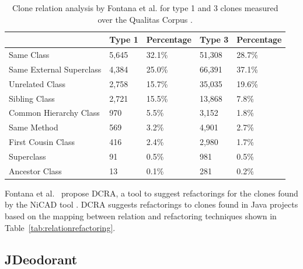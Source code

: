 \begin{table}[H]
\centering
\begin{tabular}{@{}lllll@{}}
\toprule
                         & Type 1 & Percentage & Type 3 & Percentage \\ \midrule
Same Class               & 5,645  & 32.1\%     & 51,308 & 28.7\%     \\
Same External Superclass & 4,384  & 25.0\%     & 66,391 & 37.1\%     \\
Unrelated Class          & 2,758  & 15.7\%     & 35,035 & 19.6\%     \\
Sibling Class            & 2,721  & 15.5\%     & 13,868 & 7.8\%      \\
Common Hierarchy Class   & 970    & 5.5\%      & 3,152  & 1.8\%      \\
Same Method              & 569    & 3.2\%      & 4,901  & 2.7\%      \\
First Cousin Class       & 416    & 2.4\%      & 2,980  & 1.7\%      \\
Superclass               & 91     & 0.5\%      & 981    & 0.5\%      \\
Ancestor Class           & 13     & 0.1\%      & 281    & 0.2\%      \\ \bottomrule
\end{tabular}
\caption{Clone relation analysis by Fontana et al. \cite{fontana2012duplicated} for type 1 and 3 clones measured over the Qualitas Corpus \cite{tempero2010qualitas}.}
\label{tab:dcra-relation}
\end{table}

Fontana et al.~\cite{fontana2012duplicated, fontana2015duplicated} propose DCRA, a tool to suggest refactorings for the clones found by the NiCAD tool \cite{roy2008nicad, cordy2011nicad}. DCRA suggests refactorings to clones found in Java projects based on the mapping between relation and refactoring techniques shown in Table~\ref{tab:relationrefactoring}.

\subsection{JDeodorant}

